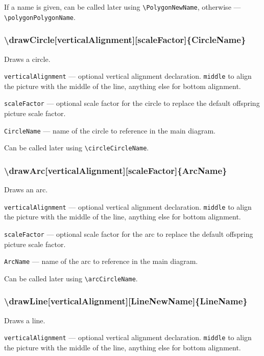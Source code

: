 \documentclass{ltxdoc}
\begin{document}
	If a name is given, can be called later using \texttt{\textbackslash PolygonNewName}, otherwise — \texttt{\textbackslash polygonPolygonName}. 
	
\subsubsection{\textbackslash drawCircle[verticalAlignment][scaleFactor]\{CircleName\}}

	Draws a circle.

	\texttt{verticalAlignment} — optional vertical alignment declaration. \texttt{middle} to align the picture with the middle of the line, anything else for bottom alignment.
	
	\texttt{scaleFactor} — optional scale factor for the circle to replace the default offspring picture scale factor. 
	
	\texttt{CircleName} — name of the circle to reference in the main diagram. 
	
	Can be called later using \texttt{\textbackslash circleCircleName}.
	
\subsubsection{\textbackslash drawArc[verticalAlignment][scaleFactor]\{ArcName\}}

	Draws an arc.

	\texttt{verticalAlignment} — optional vertical alignment declaration. \texttt{middle} to align the picture with the middle of the line, anything else for bottom alignment.
	
	\texttt{scaleFactor} — optional scale factor for the arc to replace the default offspring picture scale factor. 
	
	\texttt{ArcName} — name of the arc to reference in the main diagram. 
	
	Can be called later using \texttt{\textbackslash arcCircleName}.
	
\subsubsection{\textbackslash drawLine[verticalAlignment][LineNewName]\{LineName\}}

	Draws a line.

	\texttt{verticalAlignment} — optional vertical alignment declaration. \texttt{middle} to align the picture with the middle of the line, anything else for bottom alignment.
	
\end{document}
